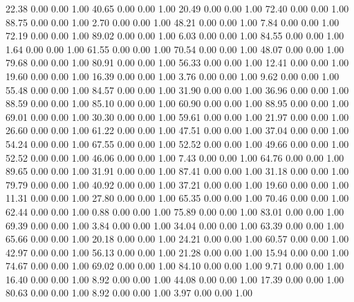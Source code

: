    22.38   0.00   0.00   1.00
   40.65   0.00   0.00   1.00
   20.49   0.00   0.00   1.00
   72.40   0.00   0.00   1.00
   88.75   0.00   0.00   1.00
    2.70   0.00   0.00   1.00
   48.21   0.00   0.00   1.00
    7.84   0.00   0.00   1.00
   72.19   0.00   0.00   1.00
   89.02   0.00   0.00   1.00
    6.03   0.00   0.00   1.00
   84.55   0.00   0.00   1.00
    1.64   0.00   0.00   1.00
   61.55   0.00   0.00   1.00
   70.54   0.00   0.00   1.00
   48.07   0.00   0.00   1.00
   79.68   0.00   0.00   1.00
   80.91   0.00   0.00   1.00
   56.33   0.00   0.00   1.00
   12.41   0.00   0.00   1.00
   19.60   0.00   0.00   1.00
   16.39   0.00   0.00   1.00
    3.76   0.00   0.00   1.00
    9.62   0.00   0.00   1.00
   55.48   0.00   0.00   1.00
   84.57   0.00   0.00   1.00
   31.90   0.00   0.00   1.00
   36.96   0.00   0.00   1.00
   88.59   0.00   0.00   1.00
   85.10   0.00   0.00   1.00
   60.90   0.00   0.00   1.00
   88.95   0.00   0.00   1.00
   69.01   0.00   0.00   1.00
   30.30   0.00   0.00   1.00
   59.61   0.00   0.00   1.00
   21.97   0.00   0.00   1.00
   26.60   0.00   0.00   1.00
   61.22   0.00   0.00   1.00
   47.51   0.00   0.00   1.00
   37.04   0.00   0.00   1.00
   54.24   0.00   0.00   1.00
   67.55   0.00   0.00   1.00
   52.52   0.00   0.00   1.00
   49.66   0.00   0.00   1.00
   52.52   0.00   0.00   1.00
   46.06   0.00   0.00   1.00
    7.43   0.00   0.00   1.00
   64.76   0.00   0.00   1.00
   89.65   0.00   0.00   1.00
   31.91   0.00   0.00   1.00
   87.41   0.00   0.00   1.00
   31.18   0.00   0.00   1.00
   79.79   0.00   0.00   1.00
   40.92   0.00   0.00   1.00
   37.21   0.00   0.00   1.00
   19.60   0.00   0.00   1.00
   11.31   0.00   0.00   1.00
   27.80   0.00   0.00   1.00
   65.35   0.00   0.00   1.00
   70.46   0.00   0.00   1.00
   62.44   0.00   0.00   1.00
    0.88   0.00   0.00   1.00
   75.89   0.00   0.00   1.00
   83.01   0.00   0.00   1.00
   69.39   0.00   0.00   1.00
    3.84   0.00   0.00   1.00
   34.04   0.00   0.00   1.00
   63.39   0.00   0.00   1.00
   65.66   0.00   0.00   1.00
   20.18   0.00   0.00   1.00
   24.21   0.00   0.00   1.00
   60.57   0.00   0.00   1.00
   42.97   0.00   0.00   1.00
   56.13   0.00   0.00   1.00
   21.28   0.00   0.00   1.00
   15.94   0.00   0.00   1.00
   74.67   0.00   0.00   1.00
   69.02   0.00   0.00   1.00
   84.10   0.00   0.00   1.00
    9.71   0.00   0.00   1.00
   16.40   0.00   0.00   1.00
    8.92   0.00   0.00   1.00
   44.08   0.00   0.00   1.00
   17.39   0.00   0.00   1.00
   80.63   0.00   0.00   1.00
    8.92   0.00   0.00   1.00
    3.97   0.00   0.00   1.00

